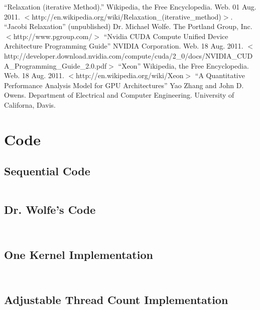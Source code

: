 \documentclass[10pt]{article}
\begin{document}
\begin{flushleft}
  \begin{thebibliography}{99}
    ``Relaxation (iterative Method).''
      Wikipedia, the Free Encyclopedia. Web. 01 Aug. 2011. $<$http://en.wikipedia.org/wiki/Relaxation\_(iterative\_method)$>$.
    ``Jacobi Relaxation'' (unpublished)
      Dr. Michael Wolfe. The Portland Group, Inc. $<$http://www.pgroup.com/$>$
    ``Nvidia CUDA Compute Unified Device Architecture Programming Guide''
      NVIDIA Corporation. Web. 18 Aug. 2011. $<$http://developer.download.nvidia.com/compute/cuda/2\_0/docs/NVIDIA\_CUDA\_Programming\_Guide\_2.0.pdf$>$
    ``Xeon''
      Wikipedia, the Free Encyclopedia. Web. 18 Aug. 2011. $<$http://en.wikipedia.org/wiki/Xeon$>$
    ``A Quantitative Performance Analysis Model for GPU Architectures''
      Yao Zhang and John D. Owens. Department of Electrical and Computer Engineering. University of Californa, Davis.
  \end{thebibliography}
\end{flushleft}

\clearpage

\appendix
\section{Code}
\label{sec:code}


\subsection{Sequential Code}
\inputminted[linenos, fontsize=\footnotesize]{c}{../jacobi_final/seq_jacobi.c}

\subsection{Dr. Wolfe's Code}
\inputminted[linenos, fontsize=\footnotesize]{c}{../jacobi_final/original_jacobi5.cu}
\inputminted[linenos, fontsize=\footnotesize]{c}{../jacobi_final/original_jacobi6.cu}

\subsection{One Kernel Implementation}
\inputminted[linenos, fontsize=\footnotesize]{c}{../jacobi_final/1k_jacobi5.cu}
\inputminted[linenos, fontsize=\footnotesize]{c}{../jacobi_final/1k_jacobi6.cu}

\subsection{Adjustable Thread Count Implementation}
\inputminted[linenos, fontsize=\footnotesize]{c}{../jacobi_final/orig_J6M_v2.cu}
\inputminted[linenos, fontsize=\footnotesize]{c}{../jacobi_final/1k_J6M_v2.cu}
\end{document}
